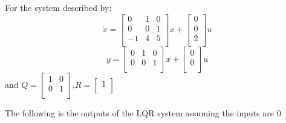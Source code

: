 For the system described by: 
\begin{equation}
\dot x = \begin{bmatrix}
0&1&0\\0&0&1\\-1&4&5\\\end{bmatrix}
x + \begin{bmatrix}
0\\0\\2\\\end{bmatrix}
u
\end{equation}
\begin{equation}
y = \begin{bmatrix}
0&1&0\\0&0&1\\\end{bmatrix}
x + \begin{bmatrix}
0\\0\\\end{bmatrix}
u
\end{equation}
 and $Q = \begin{bmatrix}
1&0\\0&1\\\end{bmatrix}
$,$R = \begin{bmatrix}
1\\\end{bmatrix}
$

The following is the outputs of the LQR system assuming the inputs are 0

